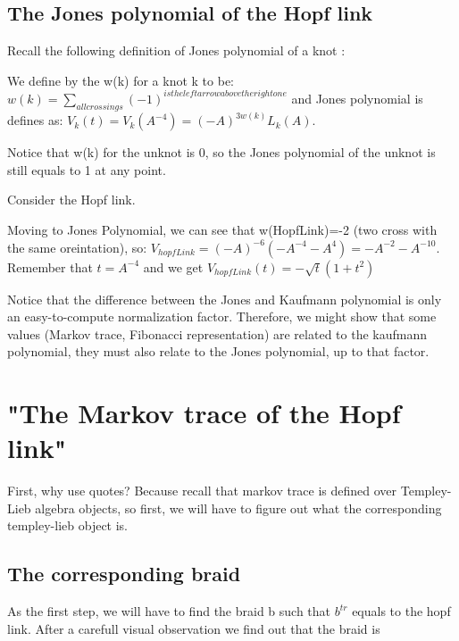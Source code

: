 \documentclass{article}
\begin{document}
\subsection{The Jones polynomial of the Hopf link}
Recall the following definition of Jones polynomial of a knot : 

We define by the w(k) for a knot k to be: \(w(k) = \sum\limits_{all crossings}{(-1)^{is the left arrow above the right one}}\)
and Jones polynomial is defines as: \(V_{k}(t)=V_{k}(A^{-4})=(-A)^{3w(k)}L_{k}(A)\).

Notice that w(k) for the unknot is 0, so the Jones polynomial of the unknot is still equals to 1 at any point.

Consider the Hopf link.

Moving to Jones Polynomial, we can see that w(HopfLink)=-2 (two cross with the same oreintation), so:
\(V_{hopfLink}=(-A)^{-6}(-A^{-4}-A^{4}) = -A^{-2} - A^{-10}\).
Remember that \(t = A^{-4}\) and we get \(V_{hopfLink}(t)=-\sqrt{t}(1+t^{2})\)  


Notice that the difference between the Jones and Kaufmann polynomial is only an easy-to-compute normalization factor. Therefore, we might show that some values (Markov trace, Fibonacci representation) are related to the kaufmann polynomial, they must also relate to the Jones polynomial, up to that factor.

\section{"The Markov trace of the Hopf link"}
First, why use quotes? Because recall that markov trace is defined over Templey-Lieb algebra objects, so first, we will have to figure out what the corresponding templey-lieb object is.

\subsection{The corresponding braid}

As the first step, we will have to find the braid b such that $b^{tr}$ equals to the hopf link. After a carefull visual observation we find out that the braid is 
\begin{center}
\end{center} 
\end{document}
